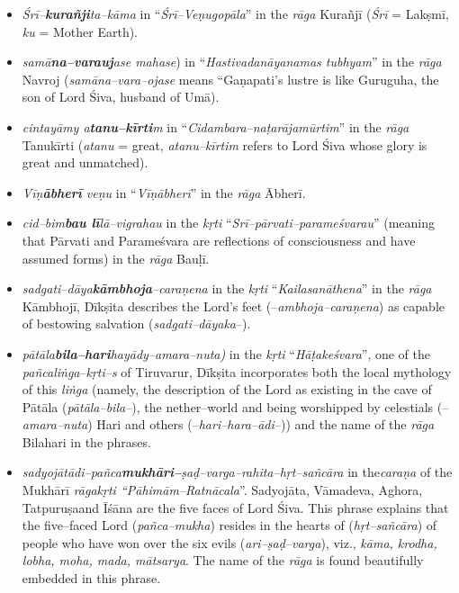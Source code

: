 \begin{itemize}
\item \textit{Śrī–\textbf{kurañji}ta–kāma} in “\textit{Śrī–Veṇugopāla}” in the \textit{rāga} Kurañjī (\textit{Śrī} = Lakṣmī, \textit{ku} = Mother Earth).

 \item \textit{samā\textbf{na–varauj}ase mahase}) in “\textit{Hastivadanāyanamas tubhyam}” in the \textit{rāga} Navroj (\textit{samāna–vara–ojase} means “Gaṇapati’s lustre is like Guruguha, the son of Lord Śiva, husband of Umā).

 \item \textit{cintayāmy a\textbf{tanu–kīrti}m} in “\textit{Cidambara–naṭarājamūrtim}” in the \textit{rāga} Tanukīrti (\textit{atanu} = great, \textit{atanu–kīrtim} refers to Lord Śiva whose glory is great and unmatched).

 \item \textit{Vīṇ\textbf{ābherī} veṇu} in “\textit{Vīṇābherī}” in the \textit{rāga} Ābherī.

 \item \textit{cid–bim\textbf{bau lī}lā–vigrahau} in the \textit{kṛti} “\textit{Srī–pārvati–parameśvarau}” (meaning that Pārvati and Parameśvara are reflections of consciousness and have assumed forms) in the \textit{rāga} Bauḷī.

 \item \textit{sadgati–dāya\textbf{kāmbhoja}–caraṇena} in the \textit{kṛti} “\textit{Kailasanāthena}” in the \textit{rāga} Kāmbhojī, Dīkṣita describes the Lord’s feet (–\textit{ambhoja–caraṇena}) as capable of bestowing salvation (\textit{sadgati–dāyaka}–).

 \item \textit{pātāla\textbf{bila–hari}hayādy–amara–nuta)} in the \textit{kṛti} “\textit{Hāṭakeśvara}”, one of the \textit{pañcaliṅga}–\textit{kṛti–s} of Tiruvarur, Dīkṣita incorporates both the local mythology of this \textit{liṅga} (namely, the description of the Lord as existing in the cave of Pātāla (\textit{pātāla–bila–}), the nether–world and being worshipped by celestials (–\textit{amara–nuta}) Hari and others (–\textit{hari–hara–ādi–})) and the name of the \textit{rāga} Bilahari in the phrases.

 \item \textit{sadyojātādi–pañca\textbf{mukhāri–}ṣaḍ–varga–rahita–hṛt–sañcāra} in the\break \textit{caraṇa} of the Mukhārī\textit{ rāgakṛti “Pāhimām–Ratnācala}”. Sadyojāta, Vāmadeva, Aghora, Tatpuruṣaand Īśāna are the five faces of Lord Śiva. This phrase explains that the five–faced Lord (\textit{pañca–mukha}) resides in the hearts of (\textit{hṛt–sañcāra}) of people who have won over the six evils (\textit{ari–ṣaḍ–varga}), viz., \textit{kāma, krodha, lobha, moha, mada, mātsarya}. The name of the \textit{rāga} is found beautifully embedded in this phrase.


\end{itemize}
